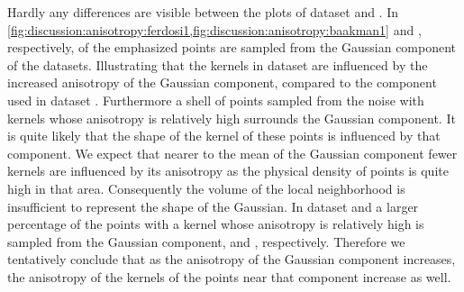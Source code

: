 				Hardly any differences are visible between the plots of dataset \ferdosiOne and \baakmanOne. 
					In \cref{fig:discussion:anisotropy:ferdosi1,fig:discussion:anisotropy:baakman1}  and , respectively, of the emphasized points are sampled from the Gaussian component of the datasets. Illustrating that the kernels in dataset \baakmanOne are influenced by the increased anisotropy of the Gaussian component, compared to the component used in dataset \ferdosiOne.
					Furthermore a shell of points sampled from the noise with kernels whose anisotropy is relatively high surrounds the Gaussian component. It is quite likely that the shape of the kernel of these points is influenced by that component. 
					We expect that nearer to the mean of the Gaussian component fewer kernels are influenced by its anisotropy as the physical density of points is quite high in that area. Consequently the volume of the local neighborhood is insufficient to represent the shape of the Gaussian.
				In dataset \baakmanFour and \baakmanFive a larger percentage of the points with a kernel whose anisotropy is relatively high is sampled from the Gaussian component,  and , respectively. 
				Therefore we tentatively conclude that as the anisotropy of the Gaussian component increases, the anisotropy of the kernels of the points near that component increase as well.
		
